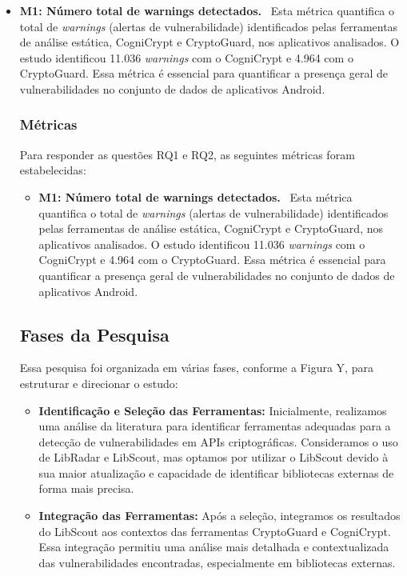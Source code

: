 \begin{itemize}
\item \textbf{M1: Número total de warnings detectados.} \
Esta métrica quantifica o total de \textit{warnings} (alertas de vulnerabilidade) identificados pelas ferramentas de análise estática, CogniCrypt e CryptoGuard, nos aplicativos analisados. O estudo identificou 11.036 \textit{warnings} com o CogniCrypt e 4.964 com o CryptoGuard. Essa métrica é essencial para quantificar a presença geral de vulnerabilidades no conjunto de dados de aplicativos Android.
\subsubsection{Métricas}
Para responder as questões RQ1 e RQ2, as seguintes métricas foram estabelecidas:

\begin{itemize}
\item \textbf{M1: Número total de warnings detectados.} \
Esta métrica quantifica o total de \textit{warnings} (alertas de vulnerabilidade) identificados pelas ferramentas de análise estática, CogniCrypt e CryptoGuard, nos aplicativos analisados. O estudo identificou 11.036 \textit{warnings} com o CogniCrypt e 4.964 com o CryptoGuard. Essa métrica é essencial para quantificar a presença geral de vulnerabilidades no conjunto de dados de aplicativos Android.

\end{itemize}

\subsection{Fases da Pesquisa}

Essa pesquisa foi organizada em várias fases, conforme a Figura Y, para estruturar e direcionar o estudo:

\begin{itemize}
\item \textbf{Identificação e Seleção das Ferramentas:} Inicialmente, realizamos uma análise da literatura para identificar ferramentas adequadas para a detecção de vulnerabilidades em APIs criptográficas. Consideramos o uso de LibRadar e LibScout, mas optamos por utilizar o LibScout devido à sua maior atualização e capacidade de identificar bibliotecas externas de forma mais precisa.

\item \textbf{Integração das Ferramentas:} Após a seleção, integramos os resultados do LibScout aos contextos das ferramentas CryptoGuard e CogniCrypt. Essa integração permitiu uma análise mais detalhada e contextualizada das vulnerabilidades encontradas, especialmente em bibliotecas externas.


\end{itemize}
\end{itemize}
